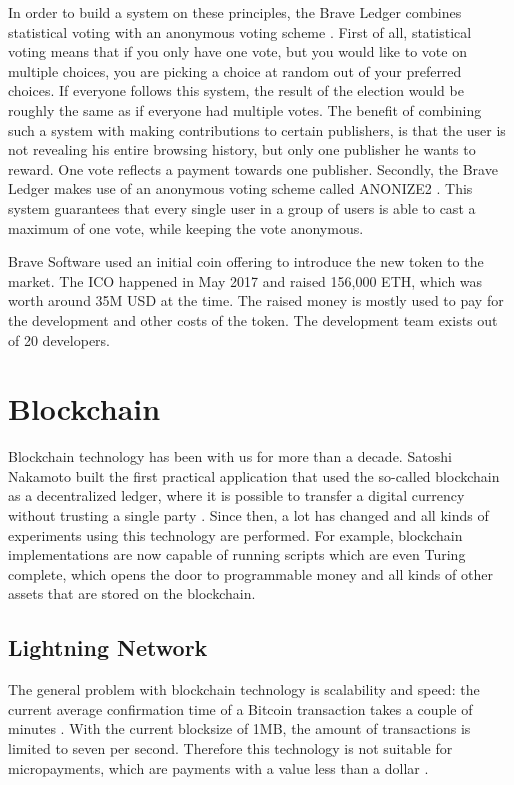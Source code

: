 In order to build a system on these principles, the Brave Ledger combines statistical voting with an anonymous voting scheme \cite{bat-ledger}. First of all, statistical voting means that if you only have one vote, but you would like to vote on multiple choices, you are picking a choice at random out of your preferred choices. If everyone follows this system, the result of the election would be roughly the same as if everyone had multiple votes. The benefit of combining such a system with making contributions to certain publishers, is that the user is not revealing his entire browsing history, but only one publisher he wants to reward. One vote reflects a payment towards one publisher. Secondly, the Brave Ledger makes use of an anonymous voting scheme called ANONIZE2 \cite{hohenberger2014anonize}. This system guarantees that every single user in a group of users is able to cast a maximum of one vote, while keeping the vote anonymous.

Brave Software used an initial coin offering to introduce the new token to the market. The ICO happened in May 2017 and raised 156,000 ETH, which was worth around 35M USD at the time. The raised money is mostly used to pay for the development and other costs of the token. The development team exists out of 20 developers.

\section{Blockchain}

Blockchain technology has been with us for more than a decade. Satoshi Nakamoto built the first practical application that used the so-called blockchain as a decentralized ledger, where it is possible to transfer a digital currency without trusting a single party \cite{nakamoto2019bitcoin}. Since then, a lot has changed and all kinds of experiments using this technology are performed. For example, blockchain implementations are now capable of running scripts which are even Turing complete, which opens the door to programmable money \cite{wood2014ethereum} and all kinds of other assets that are stored on the blockchain.

\subsection{Lightning Network}
\label{sec:lightning}
The general problem with blockchain technology is scalability and speed: the current average confirmation time of a Bitcoin transaction takes a couple of minutes \cite{bamert2013have}. With the current blocksize of 1MB, the amount of transactions is limited to seven per second. Therefore this technology is not suitable for micropayments, which are payments with a value less than a dollar \cite{definitionmicropayment}.

